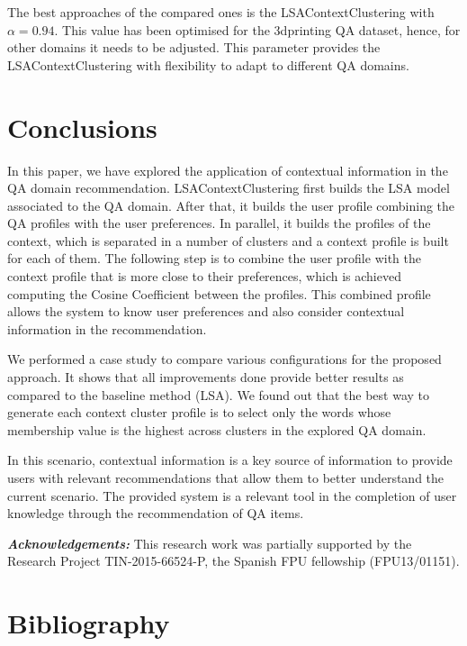 \documentclass[preprint]{elsarticle}
\begin{document}
\begin{spacing}{1.5}
The best approaches of the compared ones is the LSAContextClustering with $\alpha=0.94$. This value has been optimised for the 3dprinting QA dataset, hence, for other domains it needs to be adjusted. This parameter provides the LSAContextClustering with flexibility to adapt to different QA domains.

\section{Conclusions}
\label{sec:conclusions}

In this paper, we have explored the application of contextual information in the QA domain recommendation. LSAContextClustering first builds the LSA model associated to the QA domain. After that, it builds the user profile combining the QA profiles with the user preferences. In parallel, it builds the profiles of the context, which is separated in a number of clusters and a context profile is built for each of them. The following step is to combine the user profile with the context profile that is more close to their preferences, which is achieved computing the Cosine Coefficient between the profiles. This combined profile allows the system to know user preferences and also consider contextual information in the recommendation. 

We performed a case study to compare various configurations for the proposed approach. It shows that all improvements done provide better results as compared to the baseline method (LSA). We found out that the best way to generate each context cluster profile is to select only the words whose membership value is the highest across clusters in the explored QA domain.

In this scenario, contextual information is a key source of information to provide users with relevant recommendations that allow them to better understand the current scenario. The provided system is a relevant tool in the completion of user knowledge through the recommendation of QA items.

\textbf{\textit{Acknowledgements:}} This research work was partially supported by the Research Project TIN-2015-66524-P, the Spanish FPU fellowship (FPU13/01151).

\section*{Bibliography}



\end{spacing}
\end{document}
